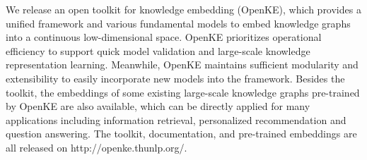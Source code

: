 We release an open toolkit for knowledge embedding (OpenKE), which provides a unified framework and various fundamental models to embed knowledge graphs into a continuous low-dimensional space. OpenKE prioritizes operational efficiency to support quick model validation and large-scale knowledge representation learning. Meanwhile, OpenKE maintains sufficient modularity and extensibility to easily incorporate new models into the framework. Besides the toolkit, the embeddings of some existing large-scale knowledge graphs pre-trained by OpenKE are also available, which can be directly applied for many applications including information retrieval, personalized recommendation and question answering. The toolkit, documentation, and pre-trained embeddings are all released on http://openke.thunlp.org/.
